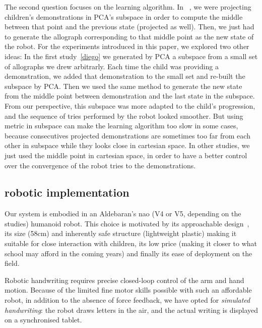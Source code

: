 \documentclass{sig-alternate}
\begin{document}
The second question focuses on the learning algorithm. In
~\cite{Hood}, we were projecting children's demonstrations in PCA's subspace in order to 
compute the middle between that point and the previous state (projected as well). Then, we just had to
generate the allograph corresponding to that middle point as the new state of
the robot. For the experiments introduced in this paper, we explored two other
ideas: In the first study~\ref{diego} we generated by PCA a subspace from a
small set of allographs we drew arbitrarly. Each time the child was providing a
demonstration, we added that demonstration to the small set and re-built the
subspace by PCA. Then we used the same method to generate the new state
from the middle point between demonstration and the last state in the subspace.
From our perspective, this subspace was more adapted to the child's
progression, and the sequence of tries performed by the robot looked smoother.
But using metric in subspace can make the learning algorithm too slow in some
cases, because consecutives projected demonstrations are sometimes too
far from each other in subspace while they looks close in cartesian space.
In other studies, we just used the middle point in cartesian space, in order to
have a better control over the convergence of the robot tries to the demonstrations.


\subsection{robotic implementation}

Our system is embodied in an Aldebaran's {\sc nao} (V4 or V5, depending on the
studies) humanoid robot. This choice is motivated by its approachable
design~\cite{Gouaillier2008}, its size (58cm) and inherently safe structure
(lightweight plastic) making it suitable for close interaction with children,
its low price (making it closer to what school may afford in the coming years)
and finally its ease of deployment on the field.

Robotic handwriting requires precise closed-loop control of the arm and hand
motion. Because of the limited fine motor skills possible with such an
affordable robot, in addition to the absence of force feedback, we have opted
for \emph{simulated handwriting}: the robot draws letters in the air, and the
actual writing is displayed on a synchronised tablet.
\end{document}
